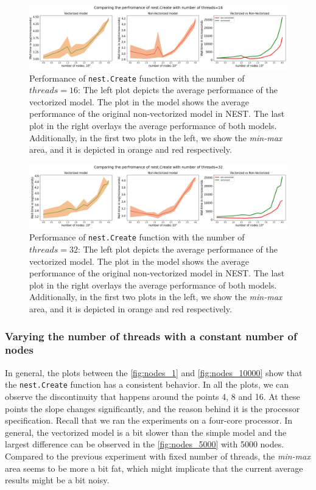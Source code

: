 \begin{figure}[ht!]
    \centering
    \includegraphics[width=\textwidth]{src/pic/thread_16.png}
    \caption{Performance of \texttt{nest.Create} function with the number of $threads=16$: The left plot depicts the average performance of the vectorized model. The plot in the model shows the average performance of the original non-vectorized model in NEST. The last plot in the right overlays the average performance of both models. Additionally, in the first two plots in the left, we show the \emph{min-max} area, and it is depicted in orange and red respectively.}
    \label{fig:threads_16}
\end{figure}

\begin{figure}[ht!]
    \centering
    \includegraphics[width=\textwidth]{src/pic/thread_32.png}
    \caption{Performance of \texttt{nest.Create} function with the number of $threads=32$: The left plot depicts the average performance of the vectorized model. The plot in the model shows the average performance of the original non-vectorized model in NEST. The last plot in the right overlays the average performance of both models. Additionally, in the first two plots in the left, we show the \emph{min-max} area, and it is depicted in orange and red respectively.}
    \label{fig:threads_32}
\end{figure}

\subsubsection*{Varying the number of threads with a constant number of nodes}


In general, the plots between the \autoref{fig:nodes_1} and \autoref{fig:nodes_10000} show that the \texttt{nest.Create} function has a consistent behavior. In all the plots, we can observe the discontinuity that happens around the points 4, 8 and 16. At these points the slope changes significantly, and the reason behind it is the processor specification. Recall that we ran the experiments on a four-core processor. In general, the vectorized model is a bit slower than the simple model and the largest difference can be observed in the \autoref{fig:nodes_5000} with 5000 nodes. Compared to the previous experiment with fixed number of threads, the \emph{min-max} area seems to be more a bit fat, which might implicate that the current average results might be a bit noisy.

